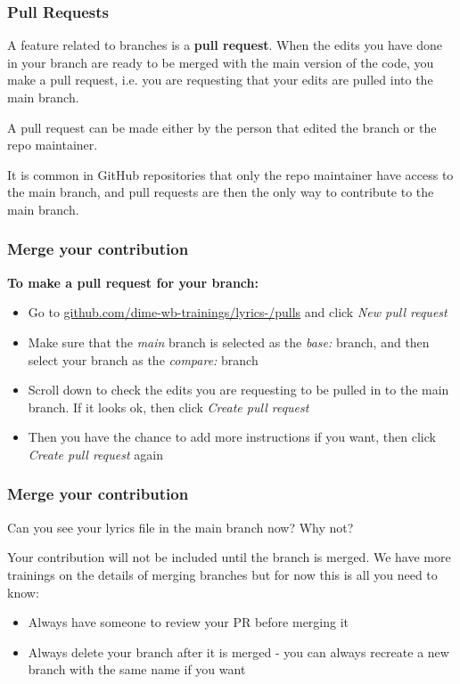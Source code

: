 \documentclass[aspectratio=169]{beamer} %
\newcommand{\trainingURL}[1]{{\color{blue}\url{#1}}}
\newcommand{\traininerUsername}{dime-wb-trainings}
\newcommand{\repoName}{\traininerUsername/lyrics-}
\newcommand{\trainingRepoURL}[1]{\trainingURL{github.com/\repoName #1}}
\begin{document}
\begin{frame}
\frametitle{Pull Requests}

	A feature related to branches is a \textbf{pull request}.
	When the edits you have done in your branch
	are ready to be merged with the main version of the code,
	you make a pull request, i.e. you are requesting that
	your edits are pulled into the main branch.


	A pull request can be made either by the person that edited the branch or the repo maintainer.

	It is common in GitHub repositories that only the repo maintainer have access to the main branch, and pull requests are then the only way to contribute to the main branch.


\end{frame}

\begin{frame}
\frametitle{Merge your contribution}

	\textbf{To make a pull request for your branch:}
	\begin{itemize}
		\item Go to \trainingRepoURL{/pulls} and click \textit{New pull request}
		\item Make sure that the \textit{main} branch is selected as the \textit{base:} branch, and then select your branch as the \textit{compare:} branch
		\item Scroll down to check the edits you are requesting to be pulled in to the main branch. If it looks ok, then click \textit{Create pull request}
		\item Then you have the chance to add more instructions if you want, then click \textit{Create pull request} again
	\end{itemize}
\end{frame}

\begin{frame}
\frametitle{Merge your contribution}

Can you see your lyrics file in the main branch now? Why not?

\vspace{.5cm}

Your contribution will not be included until the branch is merged. We have more trainings on the details of merging branches but for now this is all you need to know:

	\begin{itemize}
		\item Always have someone to review your PR before merging it
		\item Always delete your branch after it is merged - you can always recreate a new branch with the same name if you want
	\end{itemize}

\end{frame}
\end{document}
